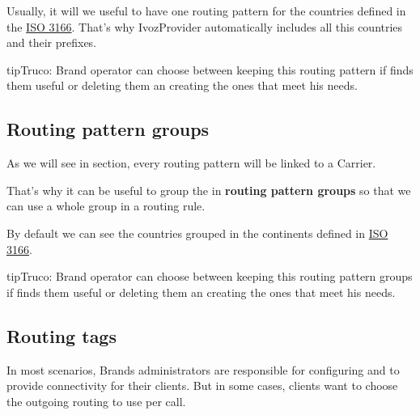 \documentclass[letterpaper,10pt,spanish]{sphinxmanual}
\begin{document}
Usually, it will we useful to have one routing pattern for the countries
defined in the \href{https://en.wikipedia.org/wiki/ISO\_3166}{ISO 3166}. That's why IvozProvider automatically
includes all this countries and their prefixes.

\begin{notice}{tip}{Truco:}
Brand operator can choose between keeping this routing pattern if
finds them useful or deleting them an creating the ones that meet his needs.
\end{notice}


\subsection{Routing pattern groups}
\label{administration_portal/brand/routing/routing_patterns_groups::doc}\label{administration_portal/brand/routing/routing_patterns_groups:routing-pattern-groups}
As we will see in {\hyperref[administration_portal/brand/routing/outgoing_routings:outgoing\string-routings]{}} section, every routing
pattern will be linked to a Carrier.

That's why it can be useful to group the {\hyperref[administration_portal/brand/routing/routing_patterns:routing\string-patterns]{}} in \textbf{routing pattern groups}
so that we can use a whole group in a routing rule.

By default we can see the countries grouped in the continents defined in
\href{https://en.wikipedia.org/wiki/ISO\_3166}{ISO 3166}.

\begin{notice}{tip}{Truco:}
Brand operator can choose between keeping this routing pattern groups if
finds them useful or deleting them an creating the ones that meet his needs.
\end{notice}


\subsection{Routing tags}
\label{administration_portal/brand/routing/routing_tags:routing-tags}\label{administration_portal/brand/routing/routing_tags::doc}
In most scenarios, Brands administrators are responsible for configuring
{\hyperref[administration_portal/brand/providers/carriers:carriers]{}} and {\hyperref[administration_portal/brand/routing/outgoing_routings:outgoing\string-routings]{}} to provide connectivity for
their clients. But in some cases, clients want to choose the outgoing routing to
use per call.
\end{document}
